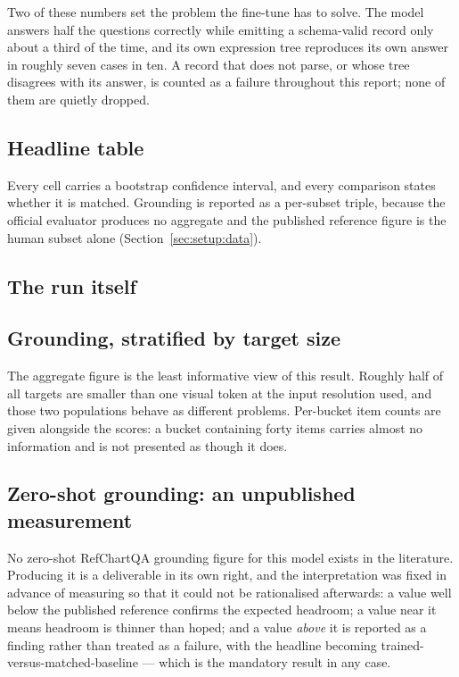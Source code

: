 

Two of these numbers set the problem the fine-tune has to solve. The model answers half the
questions correctly while emitting a schema-valid record only about a third of the time, and its
own expression tree reproduces its own answer in roughly seven cases in ten. A record that does
not parse, or whose tree disagrees with its answer, is counted as a failure throughout this
report; none of them are quietly dropped.

\subsection{Headline table}



Every cell carries a bootstrap confidence interval, and every comparison states whether it is
matched. Grounding is reported as a per-subset triple, because the official evaluator produces no
aggregate and the published reference figure is the human subset alone
(Section~\ref{sec:setup:data}).

\subsection{The run itself}
\label{sec:results:curves}



\subsection{Grounding, stratified by target size}




The aggregate figure is the least informative view of this result. Roughly half of all targets are
smaller than one visual token at the input resolution used, and those two populations behave as
different problems. Per-bucket item counts are given alongside the scores: a bucket containing forty
items carries almost no information and is not presented as though it does.

\subsection{Zero-shot grounding: an unpublished measurement}

No zero-shot RefChartQA grounding figure for this model exists in the literature. Producing it is a
deliverable in its own right, and the interpretation was fixed in advance of measuring so that it
could not be rationalised afterwards: a value well below the published reference confirms the
expected headroom; a value near it means headroom is thinner than hoped; and a value \emph{above} it
is reported as a finding rather than treated as a failure, with the headline becoming
trained-versus-matched-baseline --- which is the mandatory result in any case.

